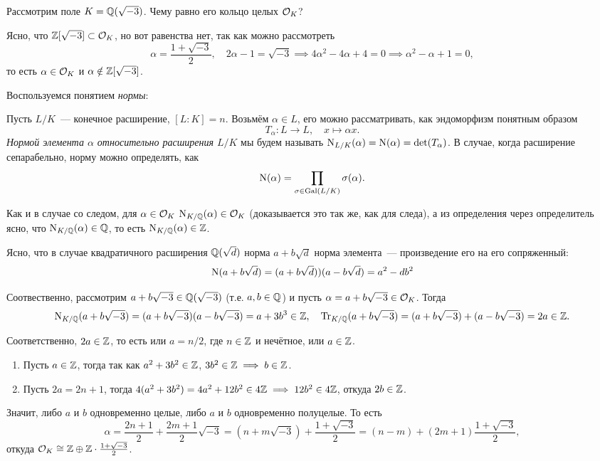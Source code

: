 	\begin{example}\label{ring_of_integers_Q(sqrt(-3))}
		Рассмотрим поле $K = \mathbb{Q}(\sqrt{-3})$. Чему равно его кольцо целых $\mathcal{O}_{K}$?

		Ясно, что $\mathbb{Z}[\sqrt{-3}] \subset \mathcal{O}_{K}$, но вот равенства нет, так как можно рассмотреть 
		\[
			\alpha = \frac{1 + \sqrt{-3}}{2}, \quad 2\alpha - 1 = \sqrt{-3} \implies 4\alpha^2 - 4\alpha + 4 = 0 \implies \alpha^2 - \alpha + 1 = 0,		
		\]
		то есть $\alpha \in \mathcal{O}_{K}$ и $\alpha \notin \mathbb{Z}[\sqrt{-3}]$. 
	

	Воспользуемся понятием \emph{нормы}:

	\begin{definition} 
		Пусть $L/K$~--- конечное расширение, $[L : K] = n$. Возьмём $\alpha \in L$, его можно рассматривать, как эндоморфизм понятным образом
		\[
			T_{\alpha}\colon L \to L, \quad x \mapsto \alpha x. 
		\]
		\emph{Нормой элемента $\alpha$ относительно расширения $L/K$} мы будем называть $\operatorname{\mathrm{N}}_{L/K}(\alpha) = \operatorname{\mathrm{N}}(\alpha) = \det(T_{\alpha})$. В случае, когда расширение сепарабельно, норму можно определять, как 
		\[
			\operatorname{\mathrm{N}}(\alpha) = \prod_{\sigma \in \operatorname{Gal}(L/K)} \sigma(\alpha).
		\]
	\end{definition}

	\begin{remark}
		Как и в случае со следом, для $\alpha \in \mathcal{O}_{K}$ $\operatorname{\mathrm{N}}_{K/\mathbb{Q}}(\alpha) \in \mathcal{O}_{K}$ (доказывается это так же, как для следа), а из определения через определитель ясно, что $\operatorname{\mathrm{N}}_{K/\mathbb{Q}}(\alpha) \in \mathbb{Q}$, то есть $\operatorname{\mathrm{N}}_{K/\mathbb{Q}}(\alpha) \in \mathbb{Z}$.
	\end{remark}

	Ясно, что в случае квадратичного расширения $\mathbb{Q}(\sqrt{d})$ норма $a + b\sqrt{d}$ норма элемента~--- произведение его на его сопряженный:
	\[
		\operatorname{\mathrm{N}}(a + b\sqrt{d}) = (a + b\sqrt{d}))(a - b\sqrt{d}) = a^2 - d b^2
	\]

	Соотвественно, рассмотрим $a + b\sqrt{-3} \in \mathbb{Q}(\sqrt{-3})$ (т.е. $a, b \in \mathbb{Q}$) и пусть $\alpha = a + b\sqrt{-3} \in \mathcal{O}_{K}$. Тогда 
	\[
		\operatorname{\mathrm{N}}_{K/\mathbb{Q}}(a + b\sqrt{-3}) = (a + b\sqrt{-3})(a - b\sqrt{-3}) = a + 3b^3 \in \mathbb{Z}, \quad \operatorname{Tr}_{K/\mathbb{Q}}(a + b\sqrt{-3}) = (a + b \sqrt{-3}) + (a - b\sqrt{-3}) = 2a \in \mathbb{Z}. 
	\]

	Соответственно, $2a \in \mathbb{Z}$, то есть или $a = n/2$, где $n \in \mathbb{Z}$ и нечётное, или $a \in \mathbb{Z}$. 

	\begin{enumerate}
		\item Пусть $a \in \mathbb{Z}$, тогда так как $a^2 + 3b^2 \in \mathbb{Z}$, $3b^2 \in \mathbb{Z} \implies b \in \mathbb{Z}$. 

		\item Пусть $2a = 2n + 1$, тогда $4(a^2 + 3b^2) = 4a^2 + 12b^2 \in 4\mathbb{Z} \implies 12b^2 \in 4\mathbb{Z}$, откуда $2b \in \mathbb{Z}$. 
	\end{enumerate}

	Значит, либо $a$ и $b$ одновременно целые, либо $a$ и $b$ одновременно полуцелые. То есть 
	\[
	 	\alpha = \frac{2n + 1}{2} + \frac{2m + 1}{2}\sqrt{-3} = (n + m\sqrt{-3}) + \frac{1 + \sqrt{-3}}{2} = (n - m) + (2m + 1)\frac{1 +\sqrt{-3}}{2},
	 \] 
	 откуда $\mathcal{O}_{K} \cong \mathbb{Z} \oplus \mathbb{Z} \cdot \frac{1 + \sqrt{-3}}{2}$.

	\end{example}


